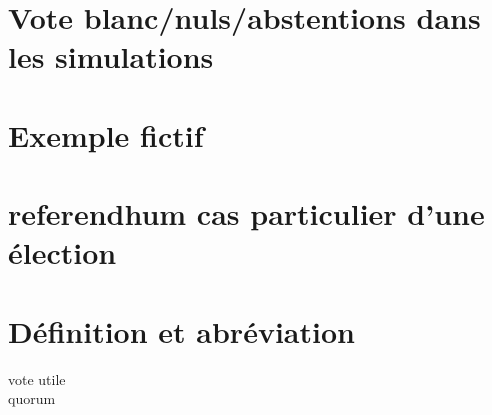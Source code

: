 \documentclass[../report]{subfiles}
\begin{document}
  \section{Vote blanc/nuls/abstentions dans les simulations}
  \section{Exemple fictif}
  \section{referendhum cas particulier d'une élection}

  \section{Définition et abréviation}
  
  \begin{description}
    \item[vote utile] 
    \item[quorum]
  \end{description}

\end{document}
